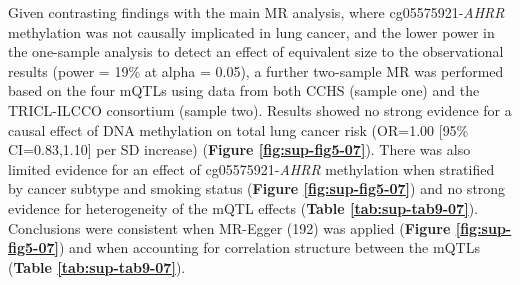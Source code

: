 \documentclass[11pt,oneside]{bristolthesis}
\begin{document}
\begin{table}[!h]

\caption{\label{tab:sup-tab8-07}One-sample MR analysis of the effect of \textit{AHRR} methylation (\%) on lung cancer risk in the CCHS}
\centering
{}
\end{table}
\linebreak

Given contrasting findings with the main MR analysis, where cg05575921-\emph{AHRR} methylation was not causally implicated in lung cancer, and the lower power in the one-sample analysis to detect an effect of equivalent size to the observational results (power = 19\% at alpha = 0.05), a further two-sample MR was performed based on the four mQTLs using data from both CCHS (sample one) and the TRICL-ILCCO consortium (sample two). Results showed no strong evidence for a causal effect of DNA methylation on total lung cancer risk (OR=1.00 {[}95\% CI=0.83,1.10{]} per SD increase) (\textbf{Figure \ref{fig:sup-fig5-07}}). There was also limited evidence for an effect of cg05575921-\emph{AHRR} methylation when stratified by cancer subtype and smoking status (\textbf{Figure \ref{fig:sup-fig5-07}}) and no strong evidence for heterogeneity of the mQTL effects (\textbf{Table \ref{tab:sup-tab9-07}}). Conclusions were consistent when MR-Egger (192) was applied (\textbf{Figure \ref{fig:sup-fig5-07}}) and when accounting for correlation structure between the mQTLs (\textbf{Table \ref{tab:sup-tab9-07}}).
\end{document}
